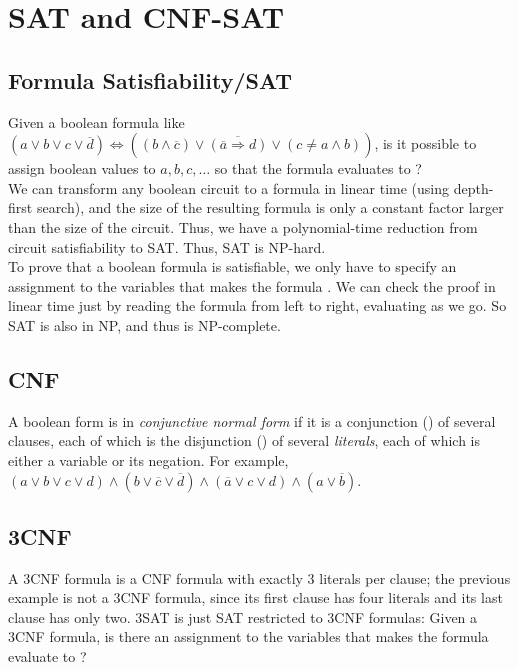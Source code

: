 \section{SAT and CNF-SAT}

\subsection{Formula Satisfiability/SAT}
Given a boolean formula like $(a \vee b \vee c \vee \overline{d}) \Leftrightarrow ((b \wedge \overline{c}) \vee \overline{ ( \overline{a} \Rightarrow d) } \vee (c \neq a \wedge b))$, is it possible to assign boolean values to $a, b, c, \ldots$ so that the formula evaluates to ?\\

We can transform any boolean circuit to a formula in linear time (using depth-first search), and the size of the resulting formula is only a constant factor larger than the size of the circuit. Thus, we have a polynomial-time reduction from circuit satisfiability to SAT. Thus, SAT is NP-hard.\\

To prove that a boolean formula is satisfiable, we only have to specify an assignment to the variables that makes the formula . We can check the proof in linear time just by reading the formula from left to right, evaluating as we go. So SAT is also in NP, and thus is NP-complete.

\subsection{CNF}
A boolean form is in \emph{conjunctive normal form} if it is a conjunction () of several clauses, each of which is the disjunction () of several \emph{literals}, each of which is either a variable or its negation. For example, $(a \vee b \vee c \vee d) \wedge (b \vee \overline{c} \vee \overline{d}) \wedge (\overline{a} \vee c \vee d) \wedge (a \vee \overline{b})$.

\subsection{3CNF}
A 3CNF formula is a CNF formula with exactly 3 literals per clause; the previous example is not a 3CNF formula, since its first clause has four literals and its last clause has only two. 3SAT is just SAT restricted to 3CNF formulas: Given a 3CNF formula, is there an assignment to the variables that makes the formula evaluate to ?

